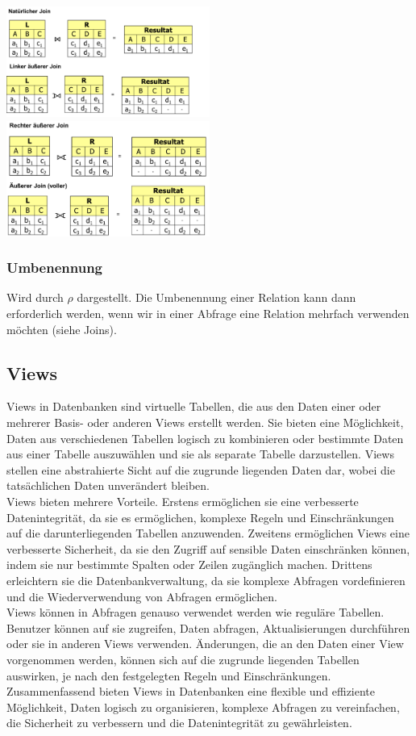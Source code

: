 \documentclass[12pt,a4paper]{article}
\begin{document}
		\includegraphics[width=0.5\textwidth]{Bilder/join1.PNG}
		\includegraphics[width=0.5\textwidth]{Bilder/join2.PNG}

		\subsubsection{Umbenennung}
			Wird durch $\rho$ dargestellt. Die Umbenennung einer Relation kann dann erforderlich werden, wenn wir in einer Abfrage eine Relation mehrfach verwenden möchten (siehe Joins).
			
	\subsection{Views}
		Views in Datenbanken sind virtuelle Tabellen, die aus den Daten einer oder mehrerer Basis- oder anderen Views erstellt werden. Sie bieten eine Möglichkeit, Daten aus verschiedenen Tabellen logisch zu kombinieren oder bestimmte Daten aus einer Tabelle auszuwählen und sie als separate Tabelle darzustellen. Views stellen eine abstrahierte Sicht auf die zugrunde liegenden Daten dar, wobei die tatsächlichen Daten unverändert bleiben.\\
		Views bieten mehrere Vorteile. Erstens ermöglichen sie eine verbesserte Datenintegrität, da sie es ermöglichen, komplexe Regeln und Einschränkungen auf die darunterliegenden Tabellen anzuwenden. Zweitens ermöglichen Views eine verbesserte Sicherheit, da sie den Zugriff auf sensible Daten einschränken können, indem sie nur bestimmte Spalten oder Zeilen zugänglich machen. Drittens erleichtern sie die Datenbankverwaltung, da sie komplexe Abfragen vordefinieren und die Wiederverwendung von Abfragen ermöglichen.\\
		Views können in Abfragen genauso verwendet werden wie reguläre Tabellen. Benutzer können auf sie zugreifen, Daten abfragen, Aktualisierungen durchführen oder sie in anderen Views verwenden. Änderungen, die an den Daten einer View vorgenommen werden, können sich auf die zugrunde liegenden Tabellen auswirken, je nach den festgelegten Regeln und Einschränkungen.\\
		Zusammenfassend bieten Views in Datenbanken eine flexible und effiziente Möglichkeit, Daten logisch zu organisieren, komplexe Abfragen zu vereinfachen, die Sicherheit zu verbessern und die Datenintegrität zu gewährleisten.
\end{document}
